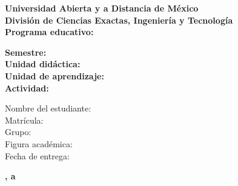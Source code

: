 \begin{titlepage} %

	\centering %

	\vspace*{\baselineskip} %


	\vspace{3.75\baselineskip} %

	{\Huge\bfseries Universidad Abierta y a Distancia de México}\\ %
	\vspace{0.75\baselineskip} %
	{\LARGE \textbf{División de Ciencias Exactas, Ingeniería y Tecnología\\}} %
	\vspace{2\baselineskip} %
	{\LARGE \textbf{Programa educativo:} \textbf{\peducativo}} %

	\vspace{2\baselineskip} %

        \begin{minipage}[c]{.7\textwidth}
            \flushleft
            {\Large \textbf{Semestre:} \semestre\\}
            {\Large \textbf{Unidad didáctica:} \udidactica\\}
            {\Large \textbf{Unidad de aprendizaje:} \uaprendizaje\\}
            {\Large \textbf{Actividad:} \actividad\\}
        \end{minipage}

	\vspace{2\baselineskip} %

        \begin{minipage}[c]{.8\textwidth}
            \flushleft
            {\large Nombre del estudiante: \estudiante\\}
            {\large Matrícula: \matricula\\}
            {\large Grupo: \grupo\\}
            {\large Figura académica: \facademica\\}
            {\large Fecha de entrega: \fechaentrega\\}
        \end{minipage}

	\vspace{4\baselineskip} %
        {\Large \textbf{\ubicacion, a \fechaentrega}}


	\vspace*{3\baselineskip} %

	\vfill %

\end{titlepage}
